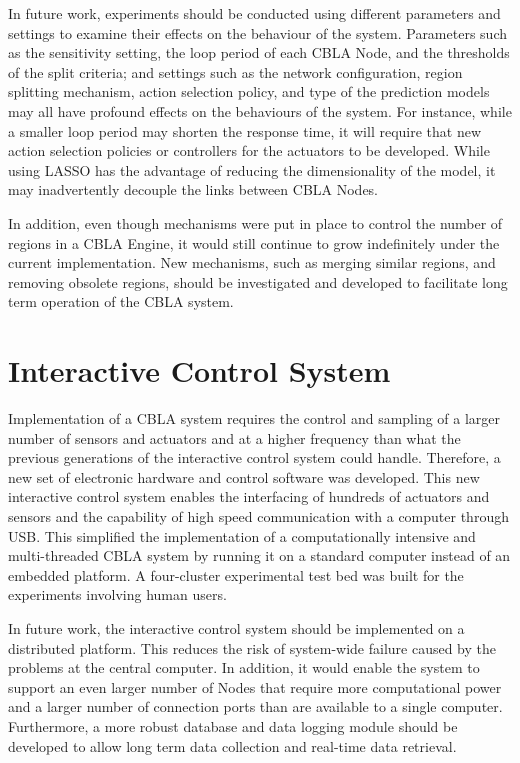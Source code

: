 In future work, experiments should be conducted using different parameters and settings to examine their effects on the behaviour of the system. Parameters such as the sensitivity setting, the loop period of each CBLA Node, and the thresholds of the split criteria; and settings such as the network configuration, region splitting mechanism, action selection policy, and type of the prediction models may all have profound effects on the behaviours of the system. For instance, while a smaller loop period may shorten the response time, it will require that new action selection policies or controllers for the actuators to be developed. While using LASSO has the advantage of reducing the dimensionality of the model, it may inadvertently decouple the links between CBLA Nodes. 

In addition, even though mechanisms were put in place to control the number of regions in a CBLA Engine, it would still continue to grow indefinitely under the current implementation. New mechanisms, such as merging similar regions, and removing obsolete regions, should be investigated and developed to facilitate long term operation of the CBLA system.


\section{Interactive Control System}
Implementation of a CBLA system requires the control and sampling of a larger number of sensors and actuators and at a higher frequency than what the previous generations of the interactive control system could handle. Therefore, a new set of electronic hardware and control software was developed. This new interactive control system enables the interfacing of hundreds of actuators and sensors and the capability of high speed communication with a computer through USB. This simplified the implementation of a computationally intensive and multi-threaded CBLA system by running it on a standard computer instead of an embedded platform. A four-cluster experimental test bed was built for the experiments involving human users.

In future work, the interactive control system should be implemented on a distributed platform. This reduces the risk of system-wide failure caused by the problems at the central computer. In addition, it would enable the system to support an even larger number of Nodes that require more computational power and a larger number of connection ports than are available to a single computer. Furthermore, a more robust database and data logging module should be developed to allow long term data collection and real-time data retrieval. 


